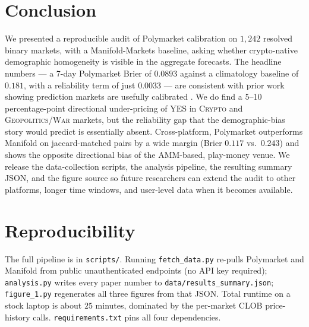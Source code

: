 \documentclass{article}
\begin{document}
\section{Conclusion}

We presented a reproducible audit of Polymarket calibration on
$1{,}242$ resolved binary markets, with a Manifold-Markets baseline,
asking whether crypto-native demographic homogeneity is visible in
the aggregate forecasts. The headline numbers --- a 7-day Polymarket
Brier of $0.0893$ against a climatology baseline of $0.181$, with a
reliability term of just $0.0033$ --- are consistent with prior work
showing prediction markets are usefully calibrated
\citep{page2013calibrated, wolfers2004prediction}. We do find a
5--10 percentage-point directional under-pricing of YES in
\textsc{Crypto} and \textsc{Geopolitics/War} markets, but the
reliability gap that the demographic-bias story would predict
is essentially absent. Cross-platform, Polymarket outperforms Manifold
on jaccard-matched pairs by a wide margin (Brier $0.117$ vs.\ $0.243$)
and shows the opposite directional bias of the AMM-based, play-money
venue. We release the data-collection scripts, the analysis pipeline,
the resulting summary JSON, and the figure source so future
researchers can extend the audit to other platforms, longer time
windows, and user-level data when it becomes available.

\section*{Reproducibility}

The full pipeline is in \texttt{scripts/}. Running \texttt{fetch\_data.py}
re-pulls Polymarket and Manifold from public unauthenticated endpoints
(no API key required); \texttt{analysis.py} writes every paper number to
\texttt{data/results\_summary.json}; \texttt{figure\_1.py} regenerates
all three figures from that JSON. Total runtime on a stock laptop is
about $25$ minutes, dominated by the per-market CLOB price-history
calls. \texttt{requirements.txt} pins all four dependencies.



\end{document}
